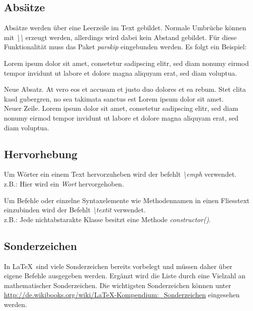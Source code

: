 \documentclass[13pt,a4paper, listof=entryprefix, bibliography=totocnumbered,toc=listofnumbered,lof=listofnumbered]{scrartcl}
\begin{document}
\subsection{Absätze}
\label{ch:absaetze}
Absätze werden über eine Leerzeile im Text gebildet. Normale Umbrüche können mit \textit{\textbackslash\textbackslash} erzeugt werden, allerdings wird dabei kein Abstand gebildet. Für diese Funktionalität muss das Paket \textit{parskip} eingebunden werden. Es folgt ein Beispiel:

Lorem ipsum dolor sit amet, consetetur sadipscing elitr, sed diam nonumy eirmod tempor invidunt ut labore et dolore magna aliquyam erat, sed diam voluptua.

Neue Absatz. At vero eos et accusam et justo duo dolores et ea rebum. Stet clita kasd gubergren, no sea takimata sanctus est Lorem ipsum dolor sit amet. \\ %
Neuer Zeile. Lorem ipsum dolor sit amet, consetetur sadipscing elitr, sed diam nonumy eirmod tempor invidunt ut labore et dolore magna aliquyam erat, sed diam voluptua.

\subsection{Hervorhebung}
\label{ch:hervorhebung}
Um Wörter ein einem Text hervorzuheben wird der befehlt \textit{\textbackslash emph} verwendet.
\\ z.B.: Hier wird ein \emph{Wort} hervorgehoben.

Um Befehle oder einzelne Syntaxelemente wie Methodennamen in einen Fliesstext einzubinden wird der Befehlt \textit{\textbackslash textit} verwendet.
\\z.B.: Jede nichtabstarakte Klasse besitzt eine Methode \textit{constructor()}.

\subsection{Sonderzeichen}
\label{ch:zeichen}

In \LaTeX \ sind viele Sonderzeichen bereits vorbelegt und müssen daher über eigene Befehle ausgegeben werden. Ergänzt wird die Liste durch eine Vielzahl an mathematischer Sonderzeichen. Die wichtigsten Sonderzeichen können unter \url{http://de.wikibooks.org/wiki/LaTeX-Kompendium:_Sonderzeichen} eingesehen werden.
\end{document}
